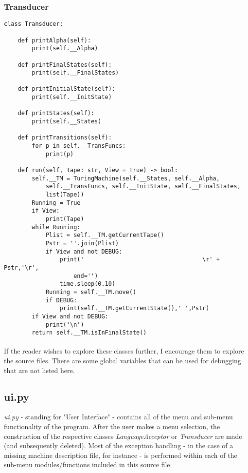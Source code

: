 \documentclass[12pt]{article}
\begin{document}
\subsubsection{Transducer}
\begin{lstlisting}
class Transducer:

    def printAlpha(self):
        print(self.__Alpha)

    def printFinalStates(self):
        print(self.__FinalStates)

    def printInitialState(self):
        print(self.__InitState)

    def printStates(self):
        print(self.__States)
    
    def printTransitions(self):
        for p in self.__TransFuncs:
            print(p)

    def run(self, Tape: str, View = True) -> bool:
        self.__TM = TuringMachine(self.__States, self.__Alpha, 
            self.__TransFuncs, self.__InitState, self.__FinalStates, 
            list(Tape))
        Running = True
        if View:
            print(Tape)
        while Running:
            Plist = self.__TM.getCurrentTape()
            Pstr = ''.join(Plist)
            if View and not DEBUG:
                print('                                  \r' + Pstr,'\r', 
                    end='')
                time.sleep(0.10)
            Running = self.__TM.move()
            if DEBUG:
                print(self.__TM.getCurrentState(),' ',Pstr)
        if View and not DEBUG:
            print('\n')
        return self.__TM.isInFinalState()
\end{lstlisting}

\paragraph{}
If the reader wishes to explore these classes further, I encourage them to 
explore the source files.  There are some global variables that can be used 
for debugging that are not listed here.

\subsection{ui.py}
\textit{ui.py} - standing for "User Interface" - contains all of the menu and 
sub-menu functionality of the program.  After the user makes a menu selection, 
the construction of the respective classes \textit{LanguageAcceptor} or 
\textit{Transducer} are made (and subsequently deleted).  Most of the 
exception handling - in the case of a missing machine description file, for 
instance - is performed within each of the sub-menu modules/functions included 
in this source file.
\end{document}
